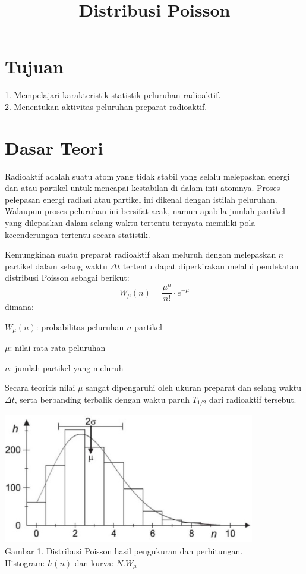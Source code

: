 \documentclass{article}
\title{Distribusi Poisson}
\date{}
\author{}
\begin{document}
	\maketitle
	
	\section*{Tujuan}
		1. Mempelajari karakteristik statistik peluruhan radioaktif.\\
		2. Menentukan aktivitas peluruhan preparat radioaktif.
	
	\section*{Dasar Teori}
	 
		\hspace{0.35 cm} Radioaktif adalah suatu atom yang tidak stabil yang selalu melepaskan energi dan atau partikel untuk mencapai kestabilan di dalam inti atomnya. Proses pelepasan energi radiasi atau partikel ini dikenal dengan istilah peluruhan. Walaupun proses peluruhan ini bersifat acak, namun apabila jumlah partikel yang dilepaskan dalam selang waktu tertentu ternyata memiliki pola kecenderungan tertentu secara statistik.\par
		Kemungkinan suatu preparat radioaktif akan meluruh dengan melepaskan $n$ partikel dalam selang waktu $\Delta t$ tertentu dapat diperkirakan melalui pendekatan distribusi Poisson
		sebagai berikut: 
		\begin{equation}
		W_{\mu}(n) = \frac{\mu^n}{n!}\cdot e^{-\mu}
		\end{equation}
		dimana:
		\par $W_{\mu}(n)$: probabilitas peluruhan $n$ partikel
		\par $\mu$: nilai rata-rata peluruhan
		\par $n$: jumlah partikel yang meluruh \\
		
		\par Secara teoritis nilai $\mu$ sangat dipengaruhi oleh ukuran preparat dan selang waktu $\Delta t$, serta berbanding terbalik dengan waktu paruh $T_{1/2}$ dari radioaktif tersebut. 
	
		
		
		\begin{center}
			\includegraphics[width=110mm]{Picture/1.jpg}\\
			Gambar 1. Distribusi Poisson hasil pengukuran dan perhitungan. \\ Histogram: $h(n)$ dan kurva: $N.W_{\mu}$
		\end{center}
		
\end{document}
